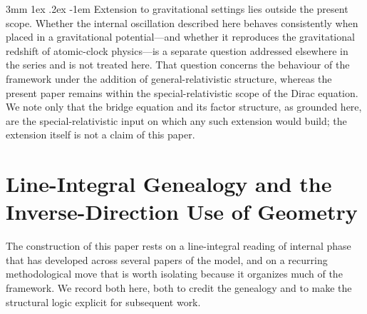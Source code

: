 \documentclass[%
 reprint, amsmath,amssymb, aps, prb, ]{revtex4-2}
\makeatletter
\numberwithin{equation}{section}
\renewcommand\paragraph{%
  \@startsection{paragraph}{4}{\z@}%
    {3mm \@plus 1ex \@minus .2ex}%
    {-1em}%
    {\normalfont\normalsize\itshape}}
\makeatother
\begin{document}
\paragraph{Extension to gravitational settings lies outside the present scope.}
Whether the internal oscillation described here behaves consistently when placed in a gravitational potential---and whether it reproduces the gravitational redshift of atomic-clock physics---is a separate question addressed elsewhere in the series and is not treated here. That question concerns the behaviour of the framework under the addition of general-relativistic structure, whereas the present paper remains within the special-relativistic scope of the Dirac equation. We note only that the bridge equation and its factor structure, as grounded here, are the special-relativistic input on which any such extension would build; the extension itself is not a claim of this paper.

\section{Line-Integral Genealogy and the Inverse-Direction Use of Geometry}
\label{app:genealogy}

The construction of this paper rests on a line-integral reading of internal phase that has developed across several papers of the model, and on a recurring methodological move that is worth isolating because it organizes much of the framework. We record both here, both to credit the genealogy and to make the structural logic explicit for subsequent work.
\end{document}
